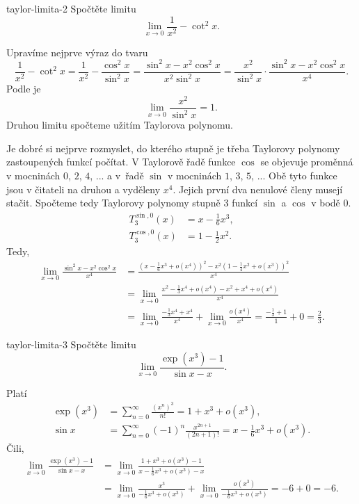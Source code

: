\begin{problem}{}{taylor-limita-2}
 Spočtěte limitu
 \[
  \lim_{x \to 0} \frac{1}{x^2} - \cot^2 x.
 \]
\end{problem}
\begin{probsol}
 Upravíme nejprve výraz do tvaru
 \[
  \frac{1}{x^2} - \cot^2 x = \frac{1}{x^2} - \frac{\cos^2 x}{\sin^2 x} =
  \frac{\sin^2 x - x^2\cos^2 x}{x^2\sin^2 x} = \frac{x^2}{\sin^2 x} \cdot
  \frac{\sin^2 x - x^2 \cos^2 x}{x^{4}}.
 \]
 Podle  je
 \[
  \lim_{x \to 0} \frac{x^2}{\sin^2x} = 1.
 \]
 Druhou limitu spočteme užitím Taylorova polynomu.

 Je dobré si nejprve rozmyslet, do kterého stupně je třeba Taylorovy polynomy
 zastoupených funkcí počítat. V Taylorově řadě funkce $\cos$ se objevuje
 proměnná v mocninách $0$, $2$, $4$, ... a v~řadě $\sin$ v mocninách $1$, $3$,
 $5$, ... Obě tyto funkce jsou v čitateli na druhou a vyděleny $x^{4}$. Jejich
 první dva nenulové členy musejí stačit. Spočteme tedy Taylorovy polynomy stupně
 $3$ funkcí $\sin$ a $\cos$ v bodě $0$.
 \begin{align*}
  T^{\sin,0}_3(x) &= x - \frac{1}{6}x^3,\\
  T^{\cos,0}_3(x) &= 1 - \frac{1}{2}x^2.
 \end{align*}
 Tedy,
 \begin{align*}
  \lim_{x \to 0} \frac{\sin^2x - x^2\cos^2 x}{x^{4}} &= \frac{\left( x -
  \frac{1}{6}x^3 + o(x^{4}) \right)^2 - x^2 \left( 1 - \frac{1}{4}x^2 + o(x^3)
  \right)^2}{x^{4}}\\
  &= \lim_{x \to 0} \frac{x^2 - \frac{1}{3}x^{4} + o(x^{4}) - x^2 + x^{4} +
  o(x^{4})}{x^{4}}\\
  &= \lim_{x \to 0} \frac{-\frac{1}{3}x^{4} + x^{4}}{x^{4}} +
  \lim_{x \to 0} \frac{o(x^{4})}{x^{4}} = \frac{-\frac{1}{3} + 1}{1} + 0 =
  \frac{2}{3}.
 \end{align*}
\end{probsol}
\begin{problem}{}{taylor-limita-3}
 Spočtěte limitu
 \[
  \lim_{x \to 0} \frac{\exp(x^3) - 1}{\sin x - x}.
 \]
\end{problem}
\begin{probsol}
 Platí
 \begin{align*}
  \exp(x^3) &= \sum_{n=0}^{\infty} \frac{(x^{n})^3}{n!} = 1 + x^3 + o(x^3),\\
  \sin x &= \sum_{n=0}^{\infty} (-1)^{n}\frac{x^{2n+1}}{(2n+1)!} = x -
  \frac{1}{6}x^3 + o(x^3).
 \end{align*}
 Čili,
 \begin{align*}
  \lim_{x \to 0} \frac{\exp(x^3) - 1}{\sin x - x} &= \lim_{x \to 0} \frac{1 + x^3
  + o(x^3) - 1}{x - \frac{1}{6}x^3 + o(x^3) - x}\\
  &= \lim_{x \to 0} \frac{x^3}{-\frac{1}{6}x^3 + o(x^3)} + \lim_{x \to 0}
  \frac{o(x^3)}{-\frac{1}{6}x^3 + o(x^3)} = -6 + 0 = -6.
 \end{align*}
\end{probsol}

